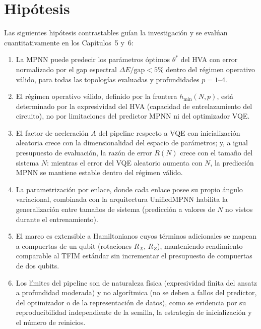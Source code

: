 \documentclass[11pt,a4paper,spanish]{book}
\begin{document}
\section{Hipótesis}

Las siguientes hipótesis contrastables guían la investigación y se evalúan cuantitativamente en los Capítulos~5 y~6:

\begin{enumerate}
    \item[\textbf{H1:}] La MPNN puede predecir los parámetros óptimos $\theta^*$ del HVA con error normalizado por el gap espectral $\Delta E/\text{gap} < 5\%$ dentro del régimen operativo válido, para todas las topologías evaluadas y profundidades $p = 1$--$4$.

    \item[\textbf{H2:}] El régimen operativo válido, definido por la frontera $h_{\min}(N, p)$, está determinado por la expresividad del HVA (capacidad de entrelazamiento del circuito), no por limitaciones del predictor MPNN ni del optimizador VQE.

    \item[\textbf{H3:}] El factor de aceleración $A$ del pipeline respecto a VQE con inicialización aleatoria crece con la dimensionalidad del espacio de parámetros; y, a igual presupuesto de evaluación, la razón de error $R(N)$ crece con el tamaño del sistema $N$: mientras el error del VQE aleatorio aumenta con $N$, la predicción MPNN se mantiene estable dentro del régimen válido.

    \item[\textbf{H4:}] La parametrización por enlace, donde cada enlace posee su propio ángulo variacional, combinada con la arquitectura UnifiedMPNN habilita la generalización entre tamaños de sistema (predicción a valores de $N$ no vistos durante el entrenamiento).

    \item[\textbf{H5:}] El marco es extensible a Hamiltonianos cuyos términos adicionales se mapean a compuertas de un qubit (rotaciones $R_X$, $R_Z$), manteniendo rendimiento comparable al TFIM estándar sin incrementar el presupuesto de compuertas de dos qubits.

    \item[\textbf{H6:}] Los límites del pipeline son de naturaleza física (expresividad finita del ansatz a profundidad moderada) y no algorítmica (no se deben a fallos del predictor, del optimizador o de la representación de datos), como se evidencia por su reproducibilidad independiente de la semilla, la estrategia de inicialización y el número de reinicios.
\end{enumerate}
\end{document}
